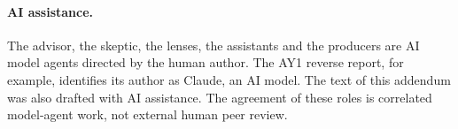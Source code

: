 \paragraph{AI assistance.}
The advisor, the skeptic, the lenses, the assistants and the producers are
AI model agents directed by the human author. The AY1 reverse report, for
example, identifies its author as Claude, an AI model. The text of this
addendum was also drafted with AI assistance. The agreement of these roles is
correlated model-agent work, not external human peer review.
